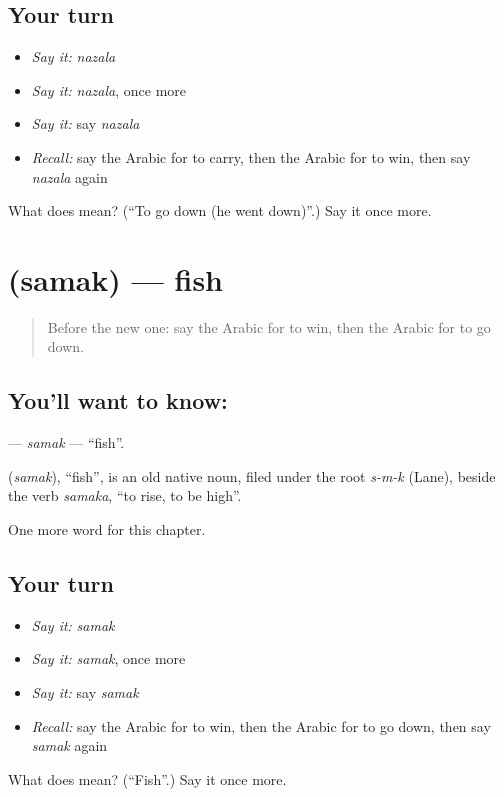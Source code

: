 \subsection*{Your turn}
\begin{itemize}
\raggedright
  \item \emph{Say it:} \emph{nazala}
  \item \emph{Say it:} \emph{nazala}, once more
  \item \emph{Say it:} say \emph{nazala}
  \item \emph{Recall:} say the Arabic for to carry, then the Arabic for to win, then say \emph{nazala} again
\end{itemize}

\begin{tcolorbox}[breakable,colback=teal!4,colframe=teal!35!black,title={Before you move on}]
What does  mean? (\textquotedblleft{}To go down (he went down)\textquotedblright{}.) Say it once more.
\end{tcolorbox}
\section[\texorpdfstring{\ar{سمك} (samak)}{سمك (samak)}]{ (samak) — fish}

\label{lesson:AR-C65-samak}



\begin{quote}
Before the new one: say the Arabic for to win, then the Arabic for to go down.
\end{quote}

\subsection*{You'll want to know: }
\textbf{} — \emph{samak} — \textquotedblleft{}fish\textquotedblright{}.

\begin{cousinweb}
\textbf{} (\emph{samak}), \textquotedblleft{}fish\textquotedblright{}, is an old native noun, filed under the root \emph{s-m-k} (Lane), beside the verb \emph{samaka}, \textquotedblleft{}to rise, to be high\textquotedblright{}.
\end{cousinweb}

\begin{grammarlens}[title={What you've built}]
One more word for this chapter.
\end{grammarlens}

\subsection*{Your turn}
\begin{itemize}
\raggedright
  \item \emph{Say it:} \emph{samak}
  \item \emph{Say it:} \emph{samak}, once more
  \item \emph{Say it:} say \emph{samak}
  \item \emph{Recall:} say the Arabic for to win, then the Arabic for to go down, then say \emph{samak} again
\end{itemize}

\begin{tcolorbox}[breakable,colback=teal!4,colframe=teal!35!black,title={Before you move on}]
What does  mean? (\textquotedblleft{}Fish\textquotedblright{}.) Say it once more.
\end{tcolorbox}
